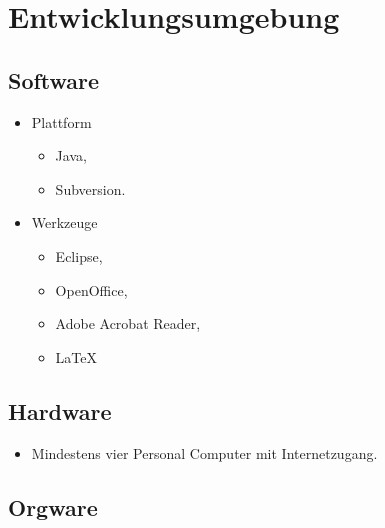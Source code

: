 \section{Entwicklungsumgebung}

 \subsection{Software}
  \begin{itemize}
   \item Plattform
     \begin{itemize}
       \item Java, 
       \item Subversion.
     \end{itemize}

    \item Werkzeuge
    \begin{itemize}
     \item Eclipse,
      \item OpenOffice,
      \item Adobe Acrobat Reader,
      \item \LaTeX
    \end{itemize}
  \end{itemize}

 \subsection{Hardware}
  \begin{itemize}
   \item Mindestens vier Personal Computer mit Internetzugang.
  \end{itemize}

 \subsection{Orgware}
